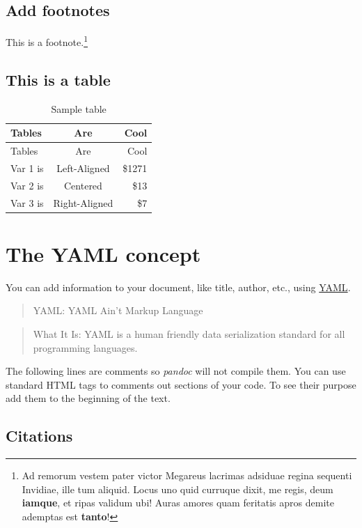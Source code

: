 \documentclass[
]{article}
\begin{document}
\hypertarget{add-footnotes}{%
\subsection{Add footnotes}\label{add-footnotes}}

This is a footnote.\footnote{Ad remorum vestem pater victor Megareus lacrimas adsiduae regina sequenti
  Invidiae, ille tum aliquid. Locus uno quid curruque dixit, me regis, deum
  \textbf{iamque}, et ripas validum ubi! Auras amores quam feritatis apros demite
  ademptas est \textbf{tanto}!}

\hypertarget{this-is-a-table}{%
\subsection{This is a table}\label{this-is-a-table}}

\begin{longtable}[]{@{}lcr@{}}
\caption{Sample table}\tabularnewline
\toprule
Tables & Are & Cool\tabularnewline
\midrule
\endfirsthead
\toprule
Tables & Are & Cool\tabularnewline
\midrule
\endhead
Var 1 is & Left-Aligned & \$1271\tabularnewline
Var 2 is & Centered & \$13\tabularnewline
Var 3 is & Right-Aligned & \$7\tabularnewline
\bottomrule
\end{longtable}

\hypertarget{the-yaml-concept}{%
\section{The YAML concept}\label{the-yaml-concept}}

You can add information to your document, like title, author, etc., using \href{https://yaml.org/}{YAML}.

\begin{quote}
YAML: YAML Ain't Markup Language
\end{quote}

\begin{quote}
What It Is: YAML is a human friendly data serialization
standard for all programming languages.
\end{quote}

The following lines are comments so \emph{pandoc} will not compile them. You can use standard HTML tags to comments out sections of your code.
To see their purpose add them to the beginning of the text.

\hypertarget{citations}{%
\subsection{Citations}\label{citations}}
\end{document}
